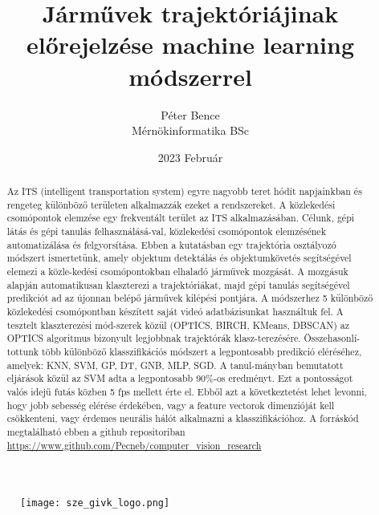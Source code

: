 \documentclass{article}
\title{Járművek trajektóriájinak előrejelzése machine learning módszerrel}
\author{Péter Bence\\Mérnökinformatika BSc}
\date{2023 Február}
\begin{document}
    
    \begin{titlepage}
        \maketitle
        \begin{figure}[H]\centering
            \texttt{[image: sze\_givk\_logo.png]}
        \end{figure}
    \end{titlepage}
    \begin{abstract}
        Az ITS (intelligent transportation system) egyre nagyobb teret 
        hódít napjainkban és rengeteg különböző területen alkalmazzák 
        ezeket a rendszereket. A közlekedési csomópontok elemzése egy 
        frekventált terület az ITS alkalmazásában.
        Célunk, gépi látás és gépi tanulás felhasználásá-val, közlekedési
        csomópontok elemzésének automatizálása és felgyorsítása. 
        Ebben a kutatásban egy trajektória osztályozó módszert ismertetünk, amely objektum 
        detektálás és objektumkövetés segítségével elemezi a közle-kedési 
        csomópontokban elhaladó járművek mozgását. A mozgásuk alapján 
        automatikusan klaszterezi a trajektóriákat, majd gépi tanulás 
        segítségével predikciót ad az újonnan belépő járművek kilépési 
        pontjára. A módszerhez 5 különböző közlekedési csomópontban 
        készített saját videó adatbázisunkat használtuk fel.
        A tesztelt klaszterezési mód-szerek közül (OPTICS, BIRCH, KMeans, DBSCAN)
        az OPTICS algoritmus bizonyult legjobbnak trajektórák klasz-terezésére.
        Összehasonlí-tottunk több különböző klasszifikációs módszert 
        a legpontosabb predikció eléréséhez, amelyek: KNN, SVM, GP, DT, 
        GNB, MLP, SGD. A tanul-mányban bemutatott eljárások közül az 
        SVM adta a legpontosabb 90\%-os eredményt.
        Ezt a pontosságot valós idejű futás közben 5 fps mellett érte el.
        Ebből azt a következtetést lehet levonni, hogy jobb sebesség elérése
        érdekében, vagy a feature vectorok dimenzióját kell csökkenteni, vagy
        érdemes neurális hálót alkalmazni a klasszifikációhoz.
        A forráskód megtalálható ebben a github repositoriban 
        \url{https://www.github.com/Pecneb/computer_vision_research}
        

\end{abstract}
\end{document}
